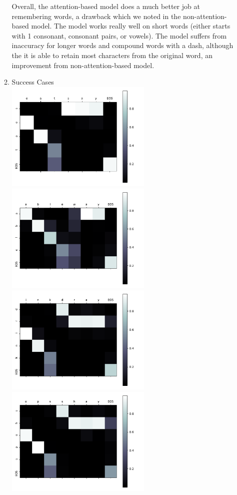 \documentclass[11pt]{article}
\begin{document}
\begin{enumerate}
\begin{enumerate}
    Overall, the attention-based model does a much better job at remembering words, a drawback which we noted in the non-attention-based model. The model works really well on short words (either starts with 1 consonant, consonant pairs, or vowels). The model suffers from inaccuracy for longer words and compound words with a dash, although the it is able to retain most characters from the original word, an improvement from non-attention-based model.
    

    \newpage 
    \item Success Cases \\
    \includegraphics[width=7cm]{assets/seat.pdf}
    \includegraphics[width=7cm]{assets/able.pdf}
    \includegraphics[width=7cm]{assets/drink.pdf}
    \includegraphics[width=7cm]{assets/shops.pdf}

\end{enumerate}
\end{enumerate}
\end{document}
